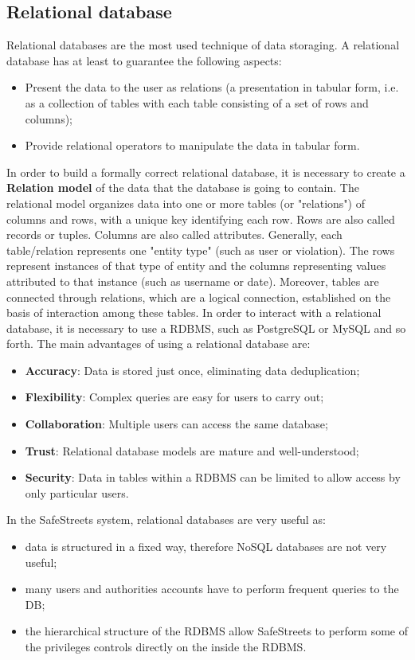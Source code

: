 \subsection{Relational database}
Relational databases are the most used technique of data storaging. A relational database has at least to guarantee the following aspects:
\begin{itemize}
    \item Present the data to the user as relations (a presentation in tabular form, i.e. as a collection of tables with each table consisting of a set of rows and columns);
    \item Provide relational operators to manipulate the data in tabular form.
\end{itemize}
In order to build a formally correct relational database, it is necessary to create a \textbf{Relation model} of the data that the database is going to contain. The relational model organizes data into one or more tables (or "relations") of columns and rows, with a unique key identifying each row. Rows are also called records or tuples. Columns are also called attributes. Generally, each table/relation represents one "entity type" (such as user or violation). The rows represent instances of that type of entity  and the columns representing values attributed to that instance (such as username or date). 
\newline Moreover, tables are connected through relations, which are a logical connection, established on the basis of interaction among these tables. 
\newline In order to interact with a relational database, it is necessary to use a RDBMS, such as PostgreSQL or MySQL and so forth.
\newline The main advantages of using a relational database are:
\begin{itemize}
    \item \textbf{Accuracy}: Data is stored just once, eliminating data deduplication;
    \item \textbf{Flexibility}: Complex queries are easy for users to carry out;
    \item \textbf{Collaboration}: Multiple users can access the same database;
    \item \textbf{Trust}: Relational database models are mature and well-understood;
    \item \textbf{Security}: Data in tables within a RDBMS can be limited to allow access by only particular users.
\end{itemize}
In the SafeStreets system, relational databases are very useful as: 
\begin{itemize}
    \item data is structured in a fixed way, therefore NoSQL databases are not very useful;
    \item many users and authorities accounts have to perform frequent queries to the DB;
    \item the hierarchical structure of the RDBMS allow SafeStreets to perform some of the privileges controls directly on the inside the RDBMS.
\end{itemize}
